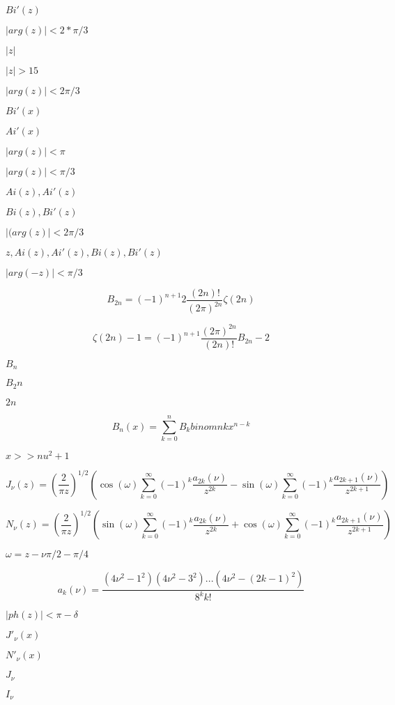 \documentclass{article}
\begin{document}
$ Bi'(z) $
\pagebreak

$ |arg(z)| < 2*\pi/3 $
\pagebreak

$ |z| $
\pagebreak

$ |z| > 15 $
\pagebreak

$ |arg(z)| < 2\pi/3 $
\pagebreak

$ Bi'(x) $
\pagebreak

$ Ai'(x) $
\pagebreak

$ |arg(z)| < \pi $
\pagebreak

$ |arg(z)| < \pi/3 $
\pagebreak

$ Ai(z), Ai'(z) $
\pagebreak

$ Bi(z), Bi'(z) $
\pagebreak

$ |(arg(z)| < 2\pi/3 $
\pagebreak

$ z, Ai(z), Ai'(z), Bi(z), Bi'(z) $
\pagebreak

$ |arg(-z)| < \pi/3 $
\pagebreak

\[ B_{2n} = (-1)^{n+1} 2\frac{(2n)!}{(2\pi)^{2n}} \zeta(2n) \]
\pagebreak

\[ \zeta(2n) - 1 = (-1)^{n+1} \frac{(2\pi)^{2n}}{(2n)!} B_{2n} - 2 \]
\pagebreak

$ B_n $
\pagebreak

$ B_2n $
\pagebreak

$ 2n $
\pagebreak

\[ B_n(x) = \sum_{k=0}^{n} B_k binom{n}{k} x^{n-k} \]
\pagebreak

$ x >> nu^2 + 1 $
\pagebreak

\[ J_{\nu}(z) = \left(\frac{2}{\pi z}\right)^{1/2} \left( \cos(\omega)\sum_{k=0}^{\infty}(-1)^k\frac{a_{2k}(\nu)}{z^{2k}} - \sin(\omega)\sum_{k=0}^{\infty}(-1)^k\frac{a_{2k+1}(\nu)}{z^{2k+1}} \right) \]
\pagebreak

\[ N_{\nu}(z) = \left(\frac{2}{\pi z}\right)^{1/2} \left( \sin(\omega)\sum_{k=0}^{\infty}(-1)^k\frac{a_{2k}(\nu)}{z^{2k}} + \cos(\omega)\sum_{k=0}^{\infty}(-1)^k\frac{a_{2k+1}(\nu)}{z^{2k+1}} \right) \]
\pagebreak

$ \omega = z - \nu\pi/2 - \pi/4 $
\pagebreak

\[ a_{k}(\nu) = \frac{(4\nu^2 - 1^2)(4\nu^2 - 3^2)...(4\nu^2 - (2k-1)^2)} {8^k k!} \]
\pagebreak

$ |ph(z)| < \pi - \delta $
\pagebreak

$ J'_\nu(x) $
\pagebreak

$ N'_\nu(x) $
\pagebreak

$ J_{\nu} $
\pagebreak

$ I_{\nu} $
\pagebreak
\end{document}
